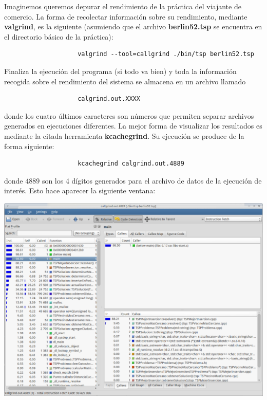 \documentclass[11pt,a4paper,professionalfonts]{article}
\begin{document}
\medskip


Imaginemos queremos depurar el rendimiento de la práctica del viajante de
comercio. La forma de recolectar información sobre su rendimiento, mediante
\textbf{valgrind}, es la siguiente (asumiendo que el archivo \textbf{berlin52.tsp}
se encuentra en el directorio básico de la práctica):

\begin{verbatim}
                    valgrind --tool=callgrind ./bin/tsp berlin52.tsp
\end{verbatim}

Finaliza la ejecución del programa (si todo va bien) y toda la información
recogida sobre el rendimiento del sistema se almacena en un archivo llamado

\begin{verbatim}
                    calgrind.out.XXXX
\end{verbatim}

\noindent donde los cuatro últimos caracteres son números que permiten separar
archivos generados en ejecuciones diferentes. La mejor forma de visualizar los
resultados es mediante la citada herramienta \textbf{kcachegrind}. Su ejecución
se produce de la forma siguiente:

\begin{verbatim}
                    kcachegrind calgrind.out.4889
\end{verbatim}

\noindent donde $4889$ son los 4 dígitos generados para el archivo de datos de
la ejecución de interés. Esto hace aparecer la siguiente ventana:

\begin{center}
\includegraphics[scale=0.40]{kcachegrind1.png}
\end{center}
\end{document}
